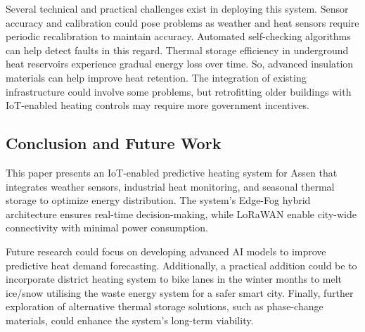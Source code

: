 \documentclass{article}
\begin{document}
Several technical and practical challenges exist in deploying this system. Sensor accuracy and calibration could pose problems as weather and heat sensors require periodic recalibration to maintain accuracy. Automated self-checking algorithms can help detect faults in this regard. Thermal storage efficiency in underground heat reservoirs experience gradual energy loss over time. So, advanced insulation materials can help improve heat retention. The integration of existing infrastructure could involve some problems, but retrofitting older buildings with IoT-enabled heating controls may require more government incentives.

\subsection{Conclusion and Future Work}

This paper presents an IoT-enabled predictive heating system for Assen that integrates weather sensors, industrial heat monitoring, and seasonal thermal storage to optimize energy distribution. The system’s Edge-Fog hybrid architecture ensures real-time decision-making, while LoRaWAN enable city-wide connectivity with minimal power consumption.

Future research could focus on developing advanced AI models to improve predictive heat demand forecasting. Additionally, a practical addition could be to incorporate district heating system to bike lanes in the winter months to melt ice/snow utilising the waste energy system for a safer smart city. Finally, further exploration of alternative thermal storage solutions, such as phase-change materials, could enhance the system’s long-term viability.



\end{document}
